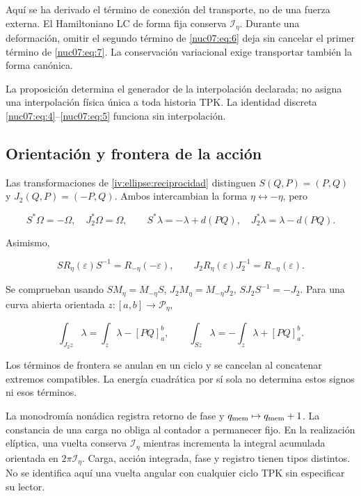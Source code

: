 Aquí se ha derivado el término de conexión del transporte, no de una fuerza externa. El Hamiltoniano LC de forma fija conserva \(\mathcal I_\eta\). Durante una deformación, omitir el segundo término de \eqref{nuc07:eq:6} deja sin cancelar el primer término de \eqref{nuc07:eq:7}. La conservación variacional exige transportar también la forma canónica.

La proposición determina el generador de la interpolación declarada; no asigna una interpolación física única a toda historia TPK. La identidad discreta \eqref{nuc07:eq:4}–\eqref{nuc07:eq:5} funciona sin interpolación.

\subsection{Orientación y frontera de la acción}

Las transformaciones de \cref{iv:ellipse:reciprocidad} distinguen \(S(Q,P)=(P,Q)\) y \(J_2(Q,P)=(-P,Q)\). Ambos intercambian la forma \(\eta\leftrightarrow-\eta\), pero

\begin{equation}
S^*\Omega=-\Omega,\quad J_2^*\Omega=\Omega,\qquad
S^*\lambda=-\lambda+d(PQ),\quad
J_2^*\lambda=\lambda-d(PQ).
\label{nuc07:eq:9}
\end{equation}

Asimismo,

\begin{equation}
S R_\eta(\varepsilon)S^{-1}=R_{-\eta}(-\varepsilon),\qquad
J_2R_\eta(\varepsilon)J_2^{-1}=R_{-\eta}(\varepsilon).
\label{nuc07:eq:10}
\end{equation}

Se comprueban usando \(SM_\eta=M_{-\eta}S\), \(J_2M_\eta=M_{-\eta}J_2\), \(SJ_2S^{-1}=-J_2\). Para una curva abierta orientada \(z:[a,b]\to\mathcal P_\eta\),

\begin{equation}
\int_{J_2z}\lambda=\int_z\lambda-[PQ]_a^b,\qquad
\int_{Sz}\lambda=-\int_z\lambda+[PQ]_a^b.
\label{nuc07:eq:11}
\end{equation}

Los términos de frontera se anulan en un ciclo y se cancelan al concatenar extremos compatibles. La energía cuadrática por sí sola no determina estos signos ni esos términos.

La monodromía nonádica registra retorno de fase y \(q_{\rm mem}\mapsto q_{\rm mem}+1\). La constancia de una carga no obliga al contador a permanecer fijo. En la realización elíptica, una vuelta conserva \(\mathcal I_\eta\) mientras incrementa la integral acumulada orientada en \(2\pi\mathcal I_\eta\). Carga, acción integrada, fase y registro tienen tipos distintos. No se identifica aquí una vuelta angular con cualquier ciclo TPK sin especificar su lector.


